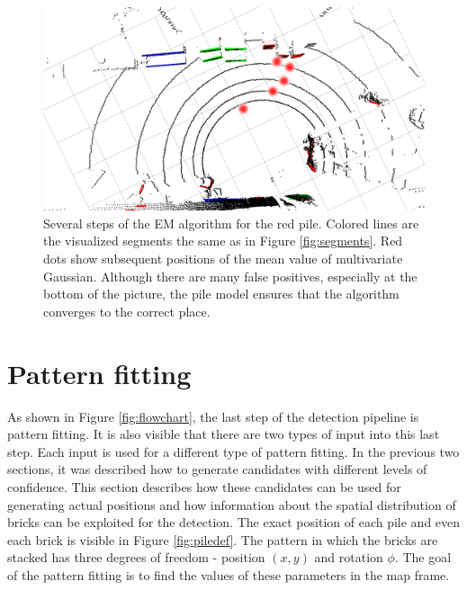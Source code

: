 \begin{figure}[H]
\centering
\includegraphics[scale=0.3]{fig/em_algo.png}
\caption[Em Algorithm in pile detector]{Several steps of the EM algorithm for the red pile. Colored lines are the visualized segments the same as in Figure \ref{fig:segments}. Red dots show subsequent positions of the mean value of multivariate Gaussian. Although there are many false positives, especially at the bottom of the picture, the pile model ensures that the algorithm converges to the correct place.}
\label{fig:em}
\end{figure}


\section{Pattern fitting}
As shown in Figure \ref{fig:flowchart}, the last step of the detection pipeline is pattern fitting. It is also visible that there are two types of input into this last step. Each input is used for a different type of pattern fitting. In the previous two sections, it was described how to generate candidates with different levels of confidence. This section describes how these candidates can be used for generating actual positions and how information about the spatial distribution of bricks can be exploited for the detection. The exact position of each pile and even each brick is visible in Figure \ref{fig:piledef}. The pattern in which the bricks are stacked has three degrees of freedom - position $(x, y)$ and rotation $\phi$. The goal of the pattern fitting is to find the values of these parameters in the map frame.

